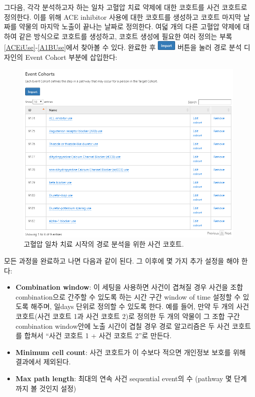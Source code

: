 \documentclass[10.5pt]{book}
\providecommand{\tightlist}{%
  \setlength{\itemsep}{0pt}\setlength{\parskip}{0pt}}
\theoremstyle{definition}
\theoremstyle{definition}
\theoremstyle{definition}
\theoremstyle{remark}
\begin{document}
그다음, 각각 분석하고자 하는 일차 고혈압 치료 약제에 대한 코호트를 사건
코호트로 정의한다. 이를 위해 ACE inhibitor 사용에 대한 코호트를 생성하고
코호트 마지막 날짜를 약물의 마지막 노출이 끝나는 날짜로 정의한다. 여덟
개의 다른 고혈압 약제에 대하여 같은 방식으로 코호트를 생성하고, 코호트
생성에 필요한 여러 정의는 부록 \ref{ACEiUse}-\ref{A1BUse}에서 찾아볼 수
있다. 완료한 후
\includegraphics{images/Characterization/atlasImportButton.png} 버튼을
눌러 경로 분석 디자인의 Event Cohort 부분에 삽입한다:

\begin{figure}

{\centering \includegraphics[width=1\linewidth]{images/Characterization/atlasPathwaysEventCohorts} 

}

\caption{고혈압 일차 치료 시작의 경로 분석을 위한 사건 코호트.}\label{fig:atlasPathwaysEventCohorts}
\end{figure}

모든 과정을 완료하고 나면 다음과 같이 된다. 그 이후에 몇 가지 추가
설정을 해야 한다:

\begin{itemize}
\tightlist
\item
  \textbf{Combination window}: 이 세팅을 사용하면 사건이 겹쳐질 경우
  사건을 조합 combination으로 간주할 수 있도록 하는 시간 구간 window of
  time 설정할 수 있도록 해주며, 일days 단위로 정의할 수 있도록 한다.
  예를 들어, 만약 두 개의 사건 코호트(사건 코호트 1과 사건 코호트 2)로
  정의한 두 개의 약물이 그 조합 구간 combination window안에 노출 시간이
  겹칠 경우 경로 알고리즘은 두 사건 코호트를 합쳐서 ``사건 코호트 1 +
  사건 코호트 2''로 만든다.
\item
  \textbf{Minimum cell count}: 사건 코호트가 이 수보다 적으면 개인정보
  보호를 위해 결과에서 제외된다.
\item
  \textbf{Max path length}: 최대의 연속 사건 sequential event의 수
  (pathway 몇 단계까지 볼 것인지 설정)
\end{itemize}
\end{document}
